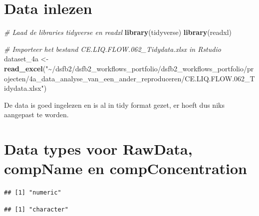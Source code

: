 \documentclass[
]{book}
\newenvironment{Shaded}{\begin{snugshade}}{\end{snugshade}}
\newcommand{\CommentTok}[1]{\textcolor[rgb]{0.56,0.35,0.01}{\textit{#1}}}
\newcommand{\FunctionTok}[1]{\textcolor[rgb]{0.13,0.29,0.53}{\textbf{#1}}}
\newcommand{\NormalTok}[1]{#1}
\newcommand{\OtherTok}[1]{\textcolor[rgb]{0.56,0.35,0.01}{#1}}
\newcommand{\SpecialCharTok}[1]{\textcolor[rgb]{0.81,0.36,0.00}{\textbf{#1}}}
\newcommand{\StringTok}[1]{\textcolor[rgb]{0.31,0.60,0.02}{#1}}
\begin{document}
\section{Data inlezen}\label{data-inlezen}

\begin{Shaded}
\begin{Highlighting}[]
\CommentTok{\# Laad de libraries tidyverse en readxl}
\FunctionTok{library}\NormalTok{(tidyverse)}
\FunctionTok{library}\NormalTok{(readxl)}

\CommentTok{\# Importeer het bestand CE.LIQ.FLOW.062\_Tidydata.xlsx in Rstudio}
\NormalTok{dataset\_4a }\OtherTok{\textless{}{-}}\FunctionTok{read\_excel}\NormalTok{(}\StringTok{"\textasciitilde{}/dsfb2/dsfb2\_workflows\_portfolio/dsfb2\_workflows\_portfolio/projecten/4a\_data\_analyse\_van\_een\_ander\_reproduceren/CE.LIQ.FLOW.062\_Tidydata.xlsx"}\NormalTok{)}
\end{Highlighting}
\end{Shaded}

\hfill\break
De data is goed ingelezen en is al in tidy format gezet, er hoeft dus niks aangepast te worden.

\section{Data types voor RawData, compName en compConcentration}\label{data-types-voor-rawdata-compname-en-compconcentration}

\begin{Shaded}
\end{Shaded}

\begin{verbatim}
## [1] "numeric"
\end{verbatim}

\begin{Shaded}
\end{Shaded}

\begin{verbatim}
## [1] "character"
\end{verbatim}
\end{document}
